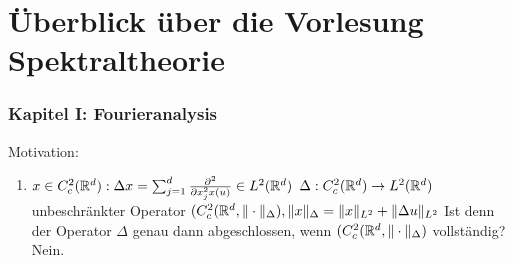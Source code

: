 \chapter*{{\"U}berblick über die Vorlesung Spektraltheorie} 

\setcounter{section}{1}


\subsection*{Kapitel I: Fourieranalysis}

Motivation:
\begin{enumerate}[label=\alph*\upshape)]
	\item $x \in C_{c}^{2}(\mathbb{R}^{d}) : \Delta x = \sum_{j = 1}^{d} \frac{\partial^{2}}{\partial x_{j}^{2} x(u)} \in L^{2}(\mathbb{R}^{d})$
		$\Delta : C_{c}^{2}(\mathbb{R}^{d}) \rightarrow L^{2}(\mathbb{R}^{d}) $ unbeschränkter Operator
		$(C_{c}^{2}(\mathbb{R}^{d}, \| \cdot \|_{\Delta}), \| x \|_{\Delta} = \| x \|_{L^{2}} + \| \Delta u \|_{L^{2}}$
		Ist denn der Operator $\Delta$ genau dann abgeschlossen, wenn $(C_{c}^{2}(\mathbb{R}^{d}, \| \cdot \|_{\Delta})$ vollständig? Nein.


\end{enumerate}
